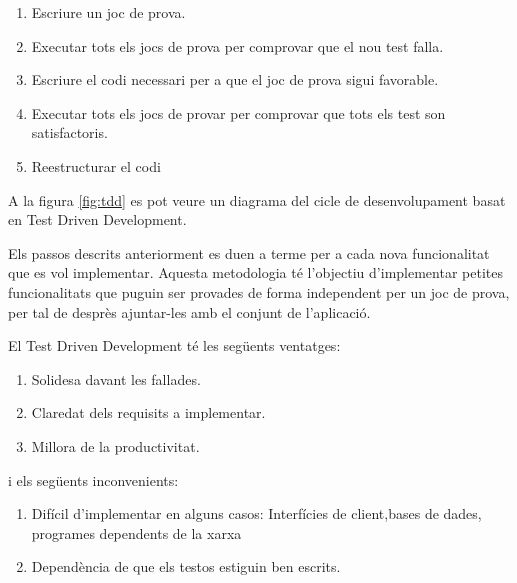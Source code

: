 \begin{enumerate}
    \item{Escriure un joc de prova.}
    \item{Executar tots els jocs de prova per comprovar que el nou test falla.}
    \item{Escriure el codi necessari per a que el joc de prova sigui favorable.}
    \item{Executar tots els jocs de provar per comprovar que tots els test son satisfactoris.}
    \item{Reestructurar el codi}
\end{enumerate}

A la figura \ref{fig:tdd} es pot veure un diagrama del cicle de desenvolupament basat en Test Driven Development.

Els passos descrits anteriorment es duen a terme per a cada nova funcionalitat que es vol implementar. Aquesta metodologia té l'objectiu d'implementar petites funcionalitats que puguin ser provades de forma independent per un joc de prova, per tal de desprès ajuntar-les amb el conjunt de l'aplicació. 

El Test Driven Development té les següents ventatges: 

\begin{enumerate}
    \item{Solidesa davant les fallades.}
    \item{Claredat dels requisits a implementar.}
    \item{Millora de la productivitat.}
\end{enumerate}

i els següents inconvenients: 

\begin{enumerate}
    \item{Difícil d'implementar en alguns casos: Interfícies de client,bases de dades, programes dependents de la xarxa }
    \item{Dependència de que els testos estiguin ben escrits. }
    
\end{enumerate}

